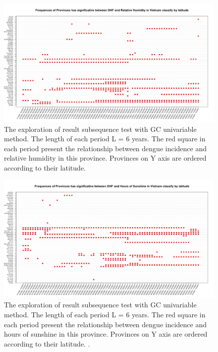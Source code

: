 \begin{figure}[h]
\begin{center}
\includegraphics[width = \linewidth]{../figures/annexe/lat_result_rh.png}
\caption{The exploration of result subsequence test with GC univariable method. The length of each period L = 6 years. The red square in each period present the relationship between dengue incidence and relative humidity in this province. Provinces on Y axis are ordered according to their latitude. }
\label{expl_12}	
\end{center}
\end{figure}

\begin{figure}[h]
\begin{center}
\includegraphics[width = \linewidth]{../figures/annexe/lat_result_sh.png}
\caption{The exploration of result subsequence test with GC univariable method. The length of each period L = 6 years. The red square in each period present the relationship between dengue incidence and hours of sunshine in this province. Provinces on Y axis are ordered according to their latitude. . }
\label{expl_13}	
\end{center}
\end{figure}

